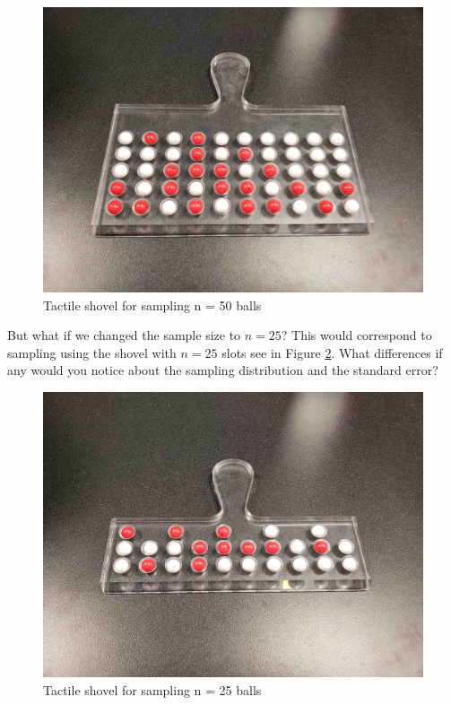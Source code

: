 \documentclass[12pt,]{krantz}
\begin{document}
\begin{figure}

{\centering \includegraphics[width=0.8\linewidth]{images/sampling/shovel_050} 

}

\caption{Tactile shovel for sampling n = 50 balls}\label{fig:shovel-n-50}
\end{figure}

But what if we changed the sample size to \(n=25\)? This would
correspond to sampling using the shovel with \(n=25\) slots see in
Figure \ref{fig:shovel-n-25}. What differences if any would you notice
about the sampling distribution and the standard error?

\begin{figure}

{\centering \includegraphics[width=0.8\linewidth]{images/sampling/shovel_025} 

}

\caption{Tactile shovel for sampling n = 25 balls}\label{fig:shovel-n-25}
\end{figure}
\end{document}
